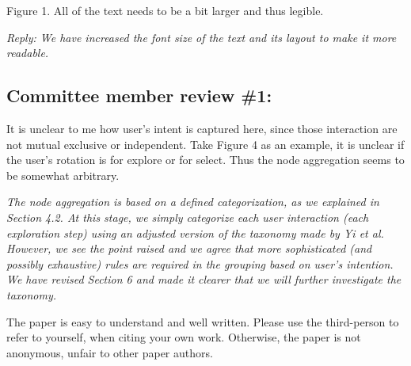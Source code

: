 \documentclass{article}
\newcommand{\cre}[1]{{\color{red}#1}}
\begin{document}
	
	\vspace{.5 cm}
	
	Figure 1. All of the text needs to be a bit larger and thus legible.
	
	{\em Reply: We have increased the font size of the text and its layout to make it more readable.
	}
	
	\vspace{.5 cm}
	
	\subsection*{Committee member review \#1:}
	
	It is unclear to me how user's intent is captured here, since those interaction
	are not mutual exclusive or independent. 
	Take Figure 4 as an example, it is unclear if the user's rotation is for explore or for select. 
	Thus the node aggregation seems to be somewhat arbitrary.
	
	
	{\em The node aggregation is based on a defined categorization, as we explained in Section 4.2. At this stage, we simply categorize each user interaction (each exploration step) using an adjusted version of the taxonomy made by Yi et al. However, we see the point raised and we agree that more sophisticated (and possibly exhaustive) rules are required in the grouping based on user's intention. We have revised Section 6 and made it clearer that we will further investigate the taxonomy.}
		
	\vspace{.5 cm}
	
	The paper is easy to understand and well written. Please use the third-person
	to refer to yourself, when citing your own work. Otherwise, the paper is not
	anonymous, unfair to other paper authors.
	
\end{document}

